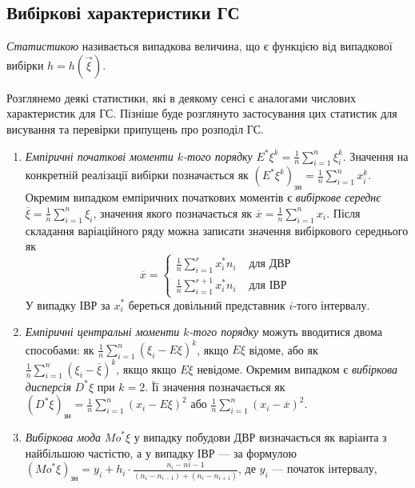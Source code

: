 \subsection{Вибіркові характеристики ГС}
\begin{definition}
    \emph{Статистикою} називається випадкова величина, що є функцією від випадкової вибірки $h = h( \vec{\xi})$.
\end{definition}
Розглянемо деякі статистики, які в деякому сенсі є аналогами числових характеристик для ГС.
Пізніше буде розглянуто застосування цих статистик для висування та перевірки припущень про розподіл ГС.
\begin{enumerate}
    \item \emph{Емпіричні початкові моменти $k$-того порядку}
    $E^* \xi^k = \frac{1}{n}\sum\limits_{i=1}^n \xi_i^k$. Значення на конкретній реалізації вибірки позначається як
    $(E^* \xi^k)_{\text{зн}} = \frac{1}{n}\sum\limits_{i=1}^n x_i^k$. Окремим випадком емпіричних початкових моментів
    є \emph{вибіркове середнє} $\overline{\xi} = \frac{1}{n}\sum\limits_{i=1}^n \xi_i$, значення якого позначається як
    $\overline{x} = \frac{1}{n}\sum\limits_{i=1}^n x_i$. Після складання варіаційного ряду можна записати значення
    вибіркового середнього як $$\overline{x} = \begin{cases}
        \frac{1}{n} \sum\limits_{i=1}^r x_i^* n_i & \text{ для ДВР} \\
        \frac{1}{n} \sum\limits_{i=1}^{r+1} x_i^* n_i & \text{ для ІВР}
    \end{cases}$$
    У випадку ІВР за $x_i^*$ береться довільний представник $i$-того інтервалу.
    \item \emph{Емпіричні центральні моменти $k$-того порядку} можуть вводитися двома способами: як 
    $\frac{1}{n}\sum\limits_{i=1}^n \left(\xi_i - E\xi \right)^k$, якщо $E\xi$ відоме, або як 
    $\frac{1}{n}\sum\limits_{i=1}^n \left(\xi_i - \overline{\xi} \right)^k$, якщо якщо $E\xi$ невідоме.
    Окремим випадком є \emph{вибіркова дисперсія} $D^* \xi$ при $k=2$. Її значення позначається як 
    $(D^* \xi)_{\text{зн}} = \frac{1}{n}\sum\limits_{i=1}^n \left(x_i - E\xi \right)^2$ або 
    $\frac{1}{n}\sum\limits_{i=1}^n \left(x_i - \overline{x} \right)^2$.
    \item \emph{Вибіркова мода} ${Mo}^* \xi$ у випадку побудови ДВР визначається як варіанта з найбільшою частістю, а у випадку
    ІВР --- за формулою $(Mo^* \xi)_{\text{зн}} = y_i + h_i \cdot \frac{n_i - n{i-1}}{(n_i - n_{i-1}) + (n_i - n_{i+1})}$, де $y_i$ --- початок інтервалу,

\end{enumerate}
